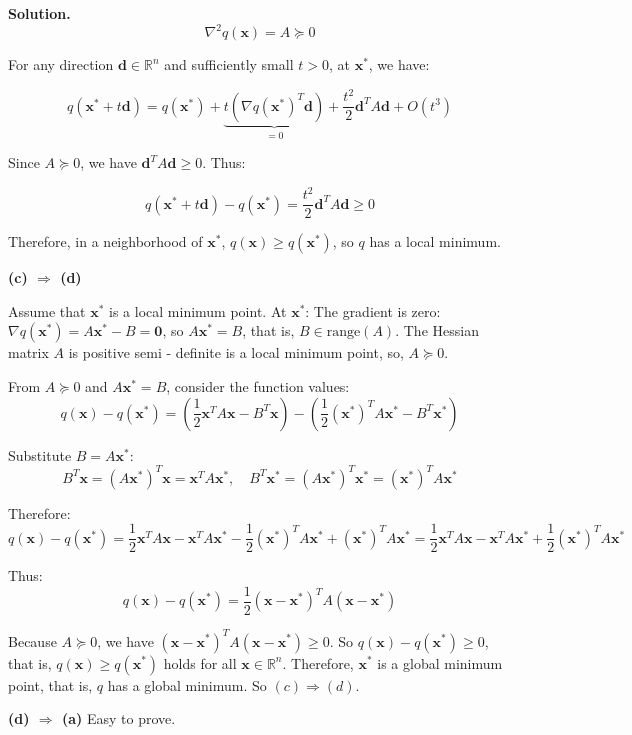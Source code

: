 \documentclass[12pt, a4paper, oneside]{ctexart}
\newenvironment{solution}{\par\noindent\textbf{Solution. }}{\par}
\begin{document}
\begin{solution}
$$
\nabla^2 q(\mathbf{x}) = A\succeq 0
$$

For any direction $ \mathbf{d} \in \mathbb{R}^n $ and sufficiently small $ t > 0 $, at $ \mathbf{x}^* $, we have:

$$q(\mathbf{x}^* + t\mathbf{d}) = q(\mathbf{x}^*) + \underbrace{t(\nabla q(\mathbf{x}^*)^T \mathbf{d})}_{= 0} + \frac{t^2}{2} \mathbf{d}^T A \mathbf{d} + O(t^3)$$

Since $ A \succeq 0 $, we have $ \mathbf{d}^T A \mathbf{d} \geq 0 $. Thus:

$$q(\mathbf{x}^* + t\mathbf{d}) - q(\mathbf{x}^*) = \frac{t^2}{2} \mathbf{d}^T A \mathbf{d} \geq 0$$

Therefore, in a neighborhood of $ \mathbf{x}^* $, $ q(\mathbf{x}) \geq q(\mathbf{x}^*) $, so $ q $ has a local minimum.

\vspace{12pt}

\textbf{(c) $\Rightarrow$ (d)}

Assume that $ \mathbf{x}^* $ is a local minimum point. At $ \mathbf{x}^* $:
The gradient is zero: $ \nabla q(\mathbf{x}^*) = A\mathbf{x}^* - B = \mathbf{0} $, so $ A\mathbf{x}^* = B $, that is, $ B \in \text{range}(A) $.
The Hessian matrix $ A $ is positive semi - definite is a local minimum point, so, $ A \succeq 0 $.

From $ A \succeq 0 $ and $ A\mathbf{x}^* = B $, consider the function values:
$$
q(\mathbf{x}) - q(\mathbf{x}^*) = \left( \frac{1}{2}\mathbf{x}^TA\mathbf{x} - B^T\mathbf{x} \right)-\left
(\frac{1}{2}(\mathbf{x}^*)^TA\mathbf{x}^* - B^T\mathbf{x}^* \right)
$$

Substitute $ B = A\mathbf{x}^* $:
$$
B^T\mathbf{x} = (A\mathbf{x}^*)^T\mathbf{x} = \mathbf{x}^TA\mathbf{x}^*, \quad B^T\mathbf{x}^* = (A\mathbf{x}^*)^T\mathbf{x}^* = (\mathbf{x}^*)^TA\mathbf{x}^*
$$

Therefore:
$$
q(\mathbf{x}) - q(\mathbf{x}^*) = \frac{1}{2}\mathbf{x}^TA\mathbf{x} - \mathbf{x}^TA\mathbf{x}^* - \frac{1}{2}(\mathbf{x}^*)^TA\mathbf{x}^* + (\mathbf{x}^*)^TA\mathbf{x}^* = \frac{1}{2}\mathbf{x}^TA\mathbf{x} - \mathbf{x}^TA\mathbf{x}^* + \frac{1}{2}(\mathbf{x}^*)^TA\mathbf{x}^*
$$

Thus:
$$
q(\mathbf{x}) - q(\mathbf{x}^*) = \frac{1}{2}(\mathbf{x} - \mathbf{x}^*)^TA(\mathbf{x} - \mathbf{x}^*)
$$

Because $ A \succeq 0 $, we have $ (\mathbf{x} - \mathbf{x}^*)^TA(\mathbf{x} - \mathbf{x}^*) \geq 0 $. So $ q(\mathbf{x}) - q(\mathbf{x}^*) \geq 0 $, that is, $ q(\mathbf{x}) \geq q(\mathbf{x}^*) $ holds for all $ \mathbf{x} \in \mathbb{R}^n $. Therefore, $ \mathbf{x}^* $ is a global minimum point, that is, $ q $ has a global minimum. So $ (c) \Rightarrow (d) $.

\vspace{12pt}

\textbf{(d) $\Rightarrow$ (a)}
Easy to prove.
\end{solution}
\end{document}
